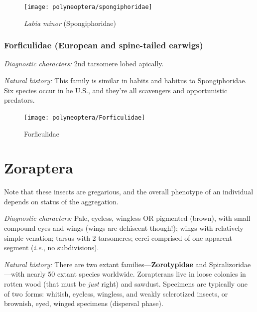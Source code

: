 \begin{figure}[ht!]
  \centering
    \texttt{[image: polyneoptera/spongiphoridae]}
  \caption{\textit{Labia minor} (Spongiphoridae) \citep[modified from][Fig. 36; original by Mohr]{bhlitem105840ross}}
  \label{fig:spongi}
\end{figure}

\subsubsection{Forficulidae (European and spine-tailed earwigs)}
\noindent{}\textit{Diagnostic characters:} 2nd tarsomere lobed apically.\vspace{3mm}

\noindent{}\textit{Natural history:} This family is similar in habits and habitus to Spongiphoridae. Six species occur in he U.S., and they're all scavengers and opportunistic predators.\vspace{3mm}

\begin{figure}[ht!]
  \centering
    \texttt{[image: polyneoptera/Forficulidae]}
  \caption{Forficulidae \citep[Modified from][]{eisner1960defense}}
  \label{fig:forfic1}
\end{figure}

\section{Zoraptera}

\noindent{}Note that these insects are gregarious, and the overall phenotype of an individual depends on status of the aggregation.\vspace{3mm}

\noindent{}\textit{Diagnostic characters:} Pale, eyeless, wingless OR pigmented (brown), with small compound eyes and wings (wings are dehiscent though!); wings with relatively simple venation; tarsus with 2 tarsomeres; cerci comprised of one apparent segment (\textit{i.e.}, no subdivisions).\vspace{3mm}

\noindent{}\textit{Natural history:} There are two extant families---\textbf{Zorotypidae} and Spiralizoridae---with nearly 50 extant species worldwide. Zorapterans live in loose colonies in rotten wood (that must be \textit{just} right) and sawdust. Specimens are typically one of two forms: whitish, eyeless, wingless, and weakly sclerotized insects, or brownish, eyed, winged specimens (dispersal phase).\vspace{3mm}

